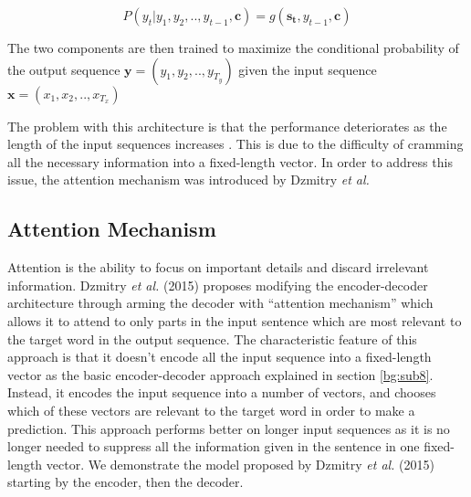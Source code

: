 \begin{equation}
\label{eq:15}
P(y_t | y_1, y_2,.., y_{t-1}, \mathbf{c}) = g(\mathbf{s_{t}}, y_{t-1}, \mathbf{c})
\end{equation}

The two components are then trained to maximize the conditional probability of the output sequence $\mathbf{y}=(y_1,y_2,..,y_{T_y})$ given the input sequence $ \mathbf{x}=(x_1,x_2,..,x_{T_x})$


The problem with this architecture is that the performance deteriorates as the length of the input sequences increases \cite{cho2014properties}. This is due to the difficulty of cramming all the necessary information into a fixed-length vector. In order to address this issue, the attention mechanism was introduced by Dzmitry \textit{et al.} \cite{bahdanau2014neural}


\subsection{Attention Mechanism} 
\label{bg:s4_sub2}

Attention is the ability to focus on important details and discard irrelevant information. Dzmitry \textit{et al.} (2015) \cite{bahdanau2014neural} proposes modifying the encoder-decoder architecture through arming the decoder with \enquote{attention mechanism} which allows it to attend to only parts in the input sentence which are most relevant to the target word in the output sequence. The characteristic feature of this approach is that it doesn't encode all the input sequence into a fixed-length vector as the basic encoder-decoder approach explained in section \ref{bg:sub8}. Instead, it encodes the input sequence into a number of vectors, and chooses which of these vectors are relevant to the target word in order to make a prediction. This approach performs better on longer input sequences as it is no longer needed to suppress all the information given in the sentence in one fixed-length vector. We demonstrate the model proposed by Dzmitry \textit{et al.} (2015) \cite{bahdanau2014neural} starting by the encoder, then the decoder.



